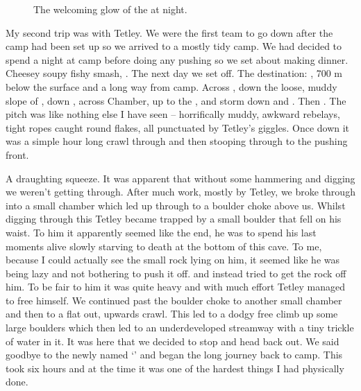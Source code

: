 \begin{figure}
\checkoddpage \ifoddpage \forcerectofloat \else \forceversofloat \fi
\centering
 \caption{The welcoming glow of the  at night. }
 \label{bivi night}
\end{figure}

My second trip was with Tetley. We were the first team to go down after the camp had been set up so we arrived to a mostly tidy camp. We had decided to spend a night at camp before doing any pushing so we set about making dinner. Cheesey soupy fishy smash, . The next day we set off. The destination: , 700 m below the surface and a long way from camp. Across , down the loose, muddy slope of , down , across  Chamber, up to the , and storm down  and . Then . The pitch was like nothing else I have seen -- horrifically muddy, awkward rebelays, tight ropes caught round flakes, all punctuated by Tetley’s giggles. Once down it was a simple hour long crawl through  and then stooping through  to the pushing front.


A draughting squeeze. It was apparent that without some hammering and digging we weren’t getting through. After much work, mostly by Tetley, we broke through into a small chamber which led up through to a boulder choke above us. Whilst digging through this Tetley became trapped by a small boulder that fell on his waist. To him it apparently seemed like the end, he was to spend his last moments alive slowly starving to death at the bottom of this cave. To me, because I could actually see the small rock lying on him, it seemed like he was being lazy and not bothering to push it off.  and instead tried to get the rock off him. To be fair to him it was quite heavy and with much effort Tetley managed to free himself. We continued past the boulder choke to another small chamber and then to a flat out, upwards crawl. This led to a dodgy free climb up some large boulders which then led to an underdeveloped streamway with a tiny trickle of water in it. It was here that we decided to stop and head back out. We said goodbye to the newly named ‘’ and began the long journey back to camp. This took six hours and at the time it was one of the hardest things I had physically done.

